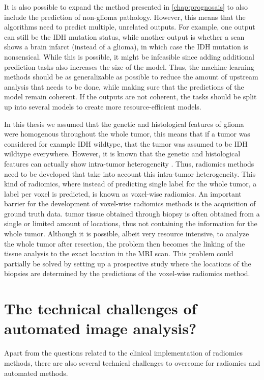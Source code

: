 It is also possible to expand the method presented in \cref{chap:prognosais} to also include the prediction of non-glioma pathology.
However, this means that the algorithms need to predict multiple, unrelated outputs.
For example, one output can still be the \gls{IDH} mutation status, while another output is whether a scan shows a brain infarct (instead of a glioma), in which case the \gls{IDH} mutation is nonsensical.
While this is possible, it might be infeasible since adding additional prediction tasks also increases the size of the model.
Thus, the machine learning methods should be as generalizable as possible to reduce the amount of upstream analysis that needs to be done, while making sure that the predictions of the model remain coherent.
If the outputs are not coherent, the tasks should be split up into several models to create more resource-efficient models.

In this thesis we assumed that the genetic and histological features of glioma were homogenous throughout the whole \gls{tumor}, this means that if a \gls{tumor} was considered for example \gls{IDH} wildtype, that the \gls{tumor} was assumed to be \gls{IDH} wildtype everywhere.
However, it is known that the genetic and histological features can actually show intra-\gls{tumor} heterogeneity \autocite{eder2014heterogeneity}.
Thus, radiomics methods need to be developed that take into account this intra-\gls{tumor} heterogeneity.
This kind of radiomics, where instead of predicting single label for the whole \gls{tumor}, a label per voxel is predicted, is known as voxel-wise radiomics.
An important barrier for the development of voxel-wise radiomics methods is the acquisition of ground truth data.
\gls{tumor} tissue obtained through biopsy is often obtained from a single or limited amount of locations, thus not containing the information for the whole \gls{tumor}.
Although it is possible, albeit very resource intensive, to analyze the whole \gls{tumor} after resection, the problem then becomes the linking of the tissue analysis to the exact location in the \gls{MRI} scan.
This problem could partially be solved by setting up a prospective study where the locations of the biopsies are determined by the predictions of the voxel-wise radiomics method.


\section{The technical challenges of automated image analysis?}\label{sec:discussion_technical}
Apart from the questions related to the clinical implementation of radiomics methods, there are also several technical challenges to overcome for radiomics and automated methods.

